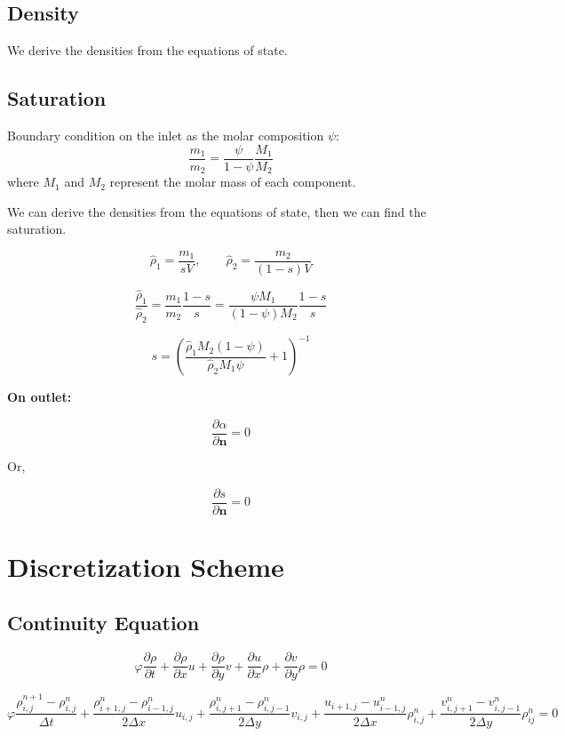\documentclass[a4paper,12pt]{article}
\begin{document}
\subsection{Density}

We derive the densities from the equations of state.

\subsection{Saturation}
    Boundary condition on the inlet as the molar
    composition \(\psi\):
    \[
        \frac{m_1}{m_2} = \frac{\psi}{1 - \psi}
        \frac{M_1}{M_2}
    \] 
    where \(M_1\) and \(M_2\) represent the molar mass 
    of each component.

    We can derive the densities from the equations of state,
    then we can find the saturation.

    \[
    \hat \rho_1 = \frac{m_1}{sV}, \qquad
    \hat \rho_2 = \frac{m_2}{(1 - s)V}
    \] 

    \[
    \frac{\hat \rho_1}{\hat \rho_2} = \frac{m_1}{m_2}
    \frac{1 - s}{s}
    = \frac{\psi M_1}{(1 - \psi) M_2}\frac{1 - s}{s}
    \] 

    \[
        s = \left( 
        \frac{\hat \rho_1 M_2(1 - \psi) }{\hat \rho_2 M_1 \psi}
    + 1 \right)^{-1}
    \] 

    \textbf{On outlet:}

    \[
    \frac{\partial \alpha}{\partial \bm{n}} = 0
    \] 

    Or,

    \[
    \frac{\partial s}{\partial \bm{n}} = 0 
    \] 

\section{Discretization Scheme}

\subsection{Continuity Equation}

\[
\varphi \frac{\partial \rho}{\partial t}
+ \frac{\partial \rho}{\partial x} u
+ \frac{\partial \rho}{\partial y} v
+ \frac{\partial u}{\partial x} \rho
+ \frac{\partial v}{\partial y} \rho = 0
\] 

\[
\varphi \frac{\rho^{n + 1}_{i, j} - \rho^n_{i, j}}{\Delta t}
+ \frac{\rho_{i+1, j}^n - \rho_{i-1,j}^n}{2\Delta x} u_{i,j}
+ \frac{\rho_{i, j+1}^n - \rho_{i,j-1}^n}{2\Delta y} v_{i,j}
+ \frac{u_{i+1, j} - u_{i-1,j}^n}{2\Delta x} \rho_{i,j}^n
+ \frac{v_{i, j+1}^n - v_{i,j-1}^n}{2\Delta y} \rho_{ij}^n = 0
\] 
\end{document}
